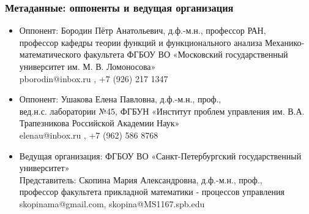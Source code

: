 \begin{frame}\frametitle{Метаданные: оппоненты и ведущая организация}
	\begin{itemize}
		\item
			Оппонент: Бородин Пётр Анатольевич, д.ф.-м.н., профессор РАН,
			\\
			профессор кафедры теории функций и функционального анализа Механико-математического факультета
			ФГБОУ ВО «Московский государственный университет им. М. В. Ломоносова»
			\\
			pborodin@inbox.ru , +7 (926) 217 1347
		\item
			Оппонент: Ушакова Елена Павловна, д.ф.-м.н., проф.,
			\\
			вед.н.с. лаборатории №45,
			ФГБУН «Институт проблем управления им. В.А. Трапезникова Российской Академии Наук»
			\\
			elenau@inbox.ru , +7 (962) 586 8768
		\item
			Ведущая организация:
			ФГБОУ ВО «Санкт-Петербургский государственный университет»
			\\
			Представитель:
			Скопина Мария Александровна, д.ф.-м.н., проф.,
			\\
			профессор факультета прикладной математики - процессов управления
			\\
			skopinama@gmail.com, skopina@MS1167.spb.edu
	\end{itemize}
\end{frame}
